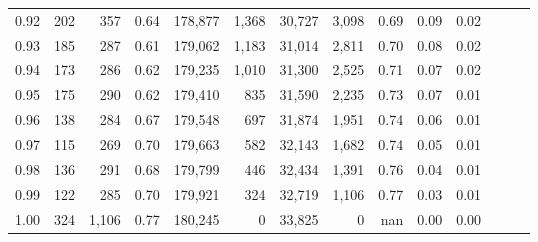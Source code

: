 \begin{tabular}{rrrrrrrrrrrrrr}
0.92 &    202 &    357 &  0.64 &  178,877 &    1,368 &  30,727 &   3,098 &  0.69 &  0.09 &      0.02 \\
0.93 &    185 &    287 &  0.61 &  179,062 &    1,183 &  31,014 &   2,811 &  0.70 &  0.08 &      0.02 \\
0.94 &    173 &    286 &  0.62 &  179,235 &    1,010 &  31,300 &   2,525 &  0.71 &  0.07 &      0.02 \\
0.95 &    175 &    290 &  0.62 &  179,410 &      835 &  31,590 &   2,235 &  0.73 &  0.07 &      0.01 \\
0.96 &    138 &    284 &  0.67 &  179,548 &      697 &  31,874 &   1,951 &  0.74 &  0.06 &      0.01 \\
0.97 &    115 &    269 &  0.70 &  179,663 &      582 &  32,143 &   1,682 &  0.74 &  0.05 &      0.01 \\
0.98 &    136 &    291 &  0.68 &  179,799 &      446 &  32,434 &   1,391 &  0.76 &  0.04 &      0.01 \\
0.99 &    122 &    285 &  0.70 &  179,921 &      324 &  32,719 &   1,106 &  0.77 &  0.03 &      0.01 \\
1.00 &    324 &  1,106 &  0.77 &  180,245 &        0 &  33,825 &       0 &   nan &  0.00 &      0.00 \\
\bottomrule
\end{tabular}
